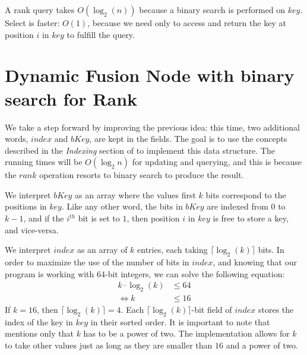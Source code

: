 A rank query takes $O(\log_2(n))$ because a binary search is performed on $key$. Select is faster: $O(1)$, because we need only to access and return the key at position $i$ in $key$ to fulfill the query.

\newpage
\section{Dynamic Fusion Node with binary search for Rank} \label{sec:DynamicFusionNodeBinaryRank}
We take a step forward by improving the previous idea: this time, two additional words, $index$ and $bKey$, are kept in the fields. The goal is to use the concepts described in the \textit{Indexing} section of \cite{patrascu2014dynamic} to implement this data structure. The running times will be $O(\log_2 n)$ for updating and querying, and this is because the $rank$ operation resorts to binary search to produce the result.

We interpret $bKey$ as an array where the values first $k$ bits correspond to the positions in $key$. Like any other word, the bits in $bKey$ are indexed from $0$ to $k-1$, and if the $i^{th}$ bit is set to $1$, then position $i$ in $key$ is free to store a key, and vice-versa.

We interpret $index$ as an array of $k$ entries, each taking $\lceil \log_2(k) \rceil$ bits. In order to maximize the use of the number of bits in $index$, and knowing that our program is working with 64-bit integers, we can solve the following equation:
\begin{align*}
    k \cdot \log_2(k) &\leq 64 \\
    \iff k &\leq 16
\end{align*}
If $k = 16$, then $\lceil \log_2(k) \rceil = 4$. Each $\lceil \log_2(k) \rceil$-bit field of $index$ stores the index of the key in $key$ in their sorted order.
It is important to note that \cite{patrascu2014dynamic} mentions only that $k$ has to be a power of two. The implementation allows for $k$ to take other values just as long as they are smaller than $16$ and a power of two.

